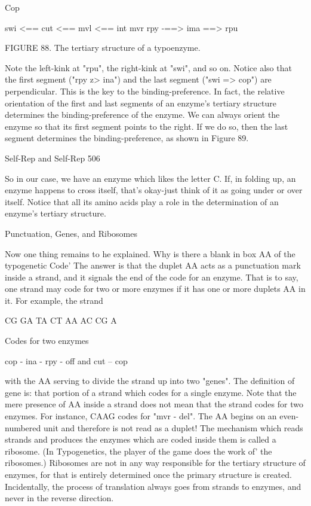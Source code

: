 {Cop

        swi <== cut <== mvl <== int
                               mvr
              rpy -==> ima ==> rpu

FIGURE 88. The tertiary structure of a typoenzyme.

Note the left-kink at "rpu", the right-kink at "swi", and so on. Notice also that the first
segment ("rpy z> ina") and the last segment ("swi => cop") are perpendicular. This is the key
to the binding-preference. In fact, the relative orientation of the first and last segments of an
enzyme's tertiary structure determines the binding-preference of the enzyme. We can always
orient the enzyme so that its first segment points to the right. If we do so, then the last
segment determines the binding-preference, as shown in Figure 89.




Self-Rep and Self-Rep                                                                            506

So in our case, we have an enzyme which likes the letter C. If, in folding up, an enzyme
happens to cross itself, that's okay-just think of it as going under or over itself. Notice that all
its amino acids play a role in the determination of an enzyme's tertiary structure.

                             Punctuation, Genes, and Ribosomes

Now one thing remains to he explained. Why is there a blank in box AA of the typogenetic
Code' The answer is that the duplet AA acts as a punctuation mark inside a strand, and it
signals the end of the code for an enzyme.
That is to say, one strand may code for two or more enzymes if it has one or more duplets
AA in it. For example, the strand

                                 CG GA TA CT AA AC CG A

Codes for two enzymes

                cop - ina - rpy - off
                        and
                    cut – cop

with the AA serving to divide the strand up into two "genes". The definition of gene is: that
portion of a strand which codes for a single enzyme. Note that the mere presence of AA
inside a strand does not mean that the strand codes for two enzymes. For instance, CAAG
codes for "mvr - del". The AA begins on an even-numbered unit and therefore is not read as a
duplet!
        The mechanism which reads strands and produces the enzymes which are coded
inside them is called a ribosome. (In Typogenetics, the player of the game does the work of'
the ribosomes.) Ribosomes are not in any way responsible for the tertiary structure of
enzymes, for that is entirely determined once the primary structure is created. Incidentally,
the process of translation always goes from strands to enzymes, and never in the reverse
direction.

}
